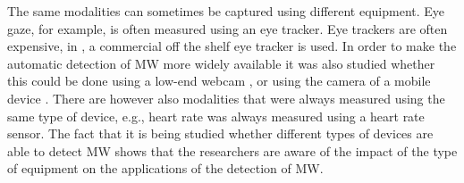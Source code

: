 The same modalities can sometimes be captured using different equipment. Eye gaze, for example, is often measured using an eye tracker. Eye trackers are often expensive, in \cite{Hutt2017OutClassroom}, a commercial off the shelf eye tracker is used. In order to make the automatic detection of MW more widely available it was also studied whether this could be done using a low-end webcam \cite{Stewart2017FaceComprehension}\cite{Stewart2016WheresViewing}\cite{Zhao2017ScalableApproach}, or using the camera of a mobile device \cite{ISI:000443429900018}. There are however also modalities that were always measured using the same type of device, e.g., heart rate was always measured using a heart rate sensor. The fact that it is being studied whether different types of devices are able to detect MW shows that the researchers are aware of the impact of the type of equipment on the applications of the detection of MW.
